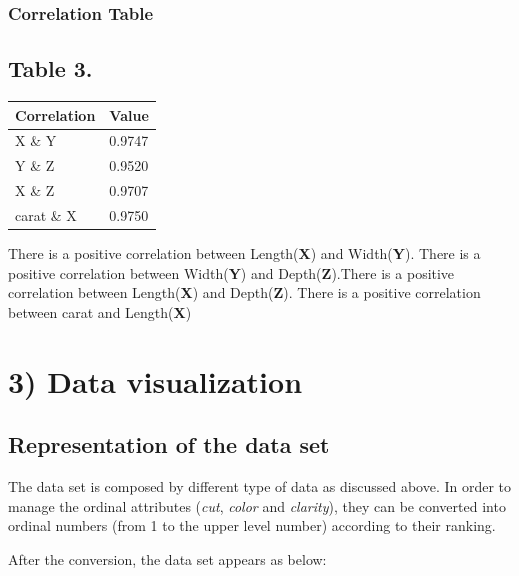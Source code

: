 \documentclass[
]{article}
\begin{document}
\hypertarget{correlation-table}{%
\subsubsection{Correlation Table}\label{correlation-table}}

\hypertarget{table-3.}{%
\subsection{Table 3.}\label{table-3.}}

\begin{longtable}[]{@{}ll@{}}
\toprule\noalign{}
Correlation & Value \\
\midrule\noalign{}
\endhead
\bottomrule\noalign{}
\endlastfoot
X \& Y & 0.9747 \\
Y \& Z & 0.9520 \\
X \& Z & 0.9707 \\
carat \& X & 0.9750 \\
\end{longtable}

There is a positive correlation between Length(\textbf{X}) and
Width(\textbf{Y}). There is a positive correlation between
Width(\textbf{Y}) and Depth(\textbf{Z}).There is a positive correlation
between Length(\textbf{X}) and Depth(\textbf{Z}). There is a positive
correlation between carat and Length(\textbf{X})

\hypertarget{data-visualization}{%
\section{3) Data visualization}\label{data-visualization}}

\hypertarget{representation-of-the-data-set}{%
\subsection{Representation of the data
set}\label{representation-of-the-data-set}}

The data set is composed by different type of data as discussed above.
In order to manage the ordinal attributes (\emph{cut}, \emph{color} and
\emph{clarity}), they can be converted into ordinal numbers (from 1 to
the upper level number) according to their ranking.

After the conversion, the data set appears as below:
\end{document}
